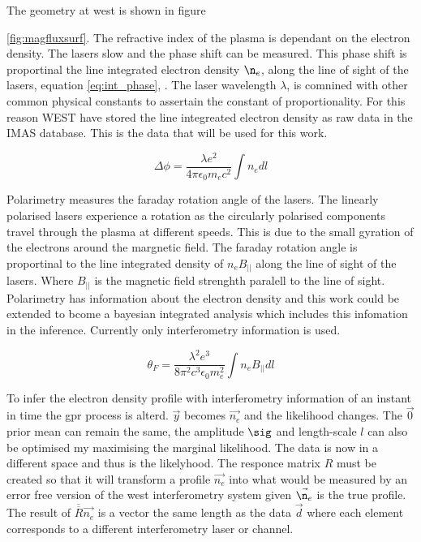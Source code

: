 The geometry at \gls{west} is shown in figure 

\ref{fig:magfluxsurf}. The refractive index of the plasma is dependant on the electron density. The lasers slow and the phase shift can be measured. This phase shift is proportinal the line integrated electron density $\n_e$, along the line of sight of the lasers, equation \ref{eq:int_phase}, \cite{princPlasDiag}. The laser wavelength $\lambda$, is comnined with other common physical constants to assertain the constant of proportionality. For this reason WEST have stored the line integreated electron density as raw data in the IMAS database. This is the data that will be used for this work.

\begin{equation} 
  \label{eq:int_phase}
  \Delta\phi = \frac{\lambda e^{2}}{4 \pi \epsilon_0 m_e c^2 } \int n_e dl
\end{equation}

Polarimetry measures the faraday rotation angle of the lasers. The linearly polarised lasers experience a rotation as the circularly polarised components travel through the plasma at different speeds. This is due to the small gyration of the electrons around the margnetic field. The faraday rotation angle is proportinal to the line integrated density of $n_e B_{||}$ along the line of sight of the lasers. Where $B_{||}$ is the magnetic field strenghth paralell to the line of sight. Polarimetry has information about the electron density and this work could be extended to bcome a bayesian integrated analysis which includes this infomation in the inference. Currently only interferometry information is used. 

\begin{equation}
	\theta_F = \frac{\lambda^2 e^3}{8 \pi^2 c^3 \epsilon_0 m_e^2} \int n_e B_{||}dl
\end{equation}

To infer the electron density profile with interferometry information of an instant in time the \gls{gpr} process is alterd. $\Vec{y}$ becomes $\Vec{n_e}$ and the likelihood changes. The $\Vec{0}$ prior mean can remain the same, the amplitude $\sig$ and length-scale $l$ can also be optimised my maximising the marginal likelihood. The data is now in a different space and thus is the likelyhood. The responce matrix $R$ must be created so that it will transform a profile $\Vec{n_e}$ into what would be measured by an error free version of the \gls{west} interferometry system given $\Vec{\n_e}$ is the true profile. The result of $\overline{\overline{R}} \Vec{n_e}$ is a vector the same length as the data $\Vec{d}$ where each element corresponds to a different interferometry laser or channel. 

